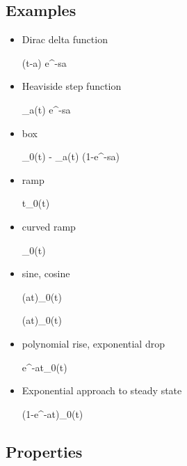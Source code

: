 \subsection{Examples}
\begin{itemize}

\item
Dirac delta function

\beq
\delta(t-a)
\maparrow{\call}
e^{-sa}
\eeq

\item 
Heaviside step function



\beq
\heavy_a(t)
\maparrow{\call}
e^{-sa}\quad {}
\eeq

\item box

\beq
\heavy_0(t) - \heavy_a(t)
\maparrow{\call} 
(1-e^{-sa})\quad{}
\eeq

\item ramp

\beq
t\;\heavy_0(t)
\maparrow{\call}
\quad{}
\eeq

\item curved ramp

\beq
{}\heavy_0(t) 
\maparrow{\call}
\quad {}
\eeq

\item sine, cosine

\beq
\sin(at)\heavy_0(t) \maparrow{\call}
\eeq

\beq
\cos(at)\heavy_0(t) \maparrow{\call}
\eeq

\item
polynomial rise, exponential drop

\beq
{}e^{-at}\;\heavy_0(t)
\maparrow{\call}
\quad{}
\eeq

\item Exponential approach to steady state

\beq
(1-e^{-at})\heavy_0(t)
\maparrow{\call}
\quad {}
\eeq
\end{itemize}

\subsection{Properties}

